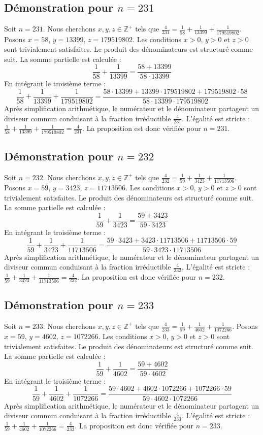 \documentclass[11pt,a4paper]{article}
\begin{document}
\subsection{Démonstration pour $n = 231$}
Soit $n = 231$. Nous cherchons $x, y, z \in \mathbb{Z}^{+}$ tels que $\frac{4}{231} = \frac{1}{58} + \frac{1}{13399} + \frac{1}{179519802}$.
Posons $x = 58$, $y = 13399$, $z = 179519802$.
Les conditions $x > 0$, $y > 0$ et $z > 0$ sont trivialement satisfaites.
Le produit des dénominateurs est structuré comme suit. La somme partielle est calculée :
$$ \frac{1}{58} + \frac{1}{13399} = \frac{58+13399}{58 \cdot 13399} $$
En intégrant le troisième terme :
$$ \frac{1}{58} + \frac{1}{13399} + \frac{1}{179519802} = \frac{58 \cdot 13399 + 13399 \cdot 179519802 + 179519802 \cdot 58}{58 \cdot 13399 \cdot 179519802} $$
Après simplification arithmétique, le numérateur et le dénominateur partagent un diviseur commun conduisant à la fraction irréductible $\frac{4}{231}$.
L'égalité est stricte : $\frac{1}{58} + \frac{1}{13399} + \frac{1}{179519802} = \frac{4}{231}$.
La proposition est donc vérifiée pour $n = 231$.
\subsection{Démonstration pour $n = 232$}
Soit $n = 232$. Nous cherchons $x, y, z \in \mathbb{Z}^{+}$ tels que $\frac{4}{232} = \frac{1}{59} + \frac{1}{3423} + \frac{1}{11713506}$.
Posons $x = 59$, $y = 3423$, $z = 11713506$.
Les conditions $x > 0$, $y > 0$ et $z > 0$ sont trivialement satisfaites.
Le produit des dénominateurs est structuré comme suit. La somme partielle est calculée :
$$ \frac{1}{59} + \frac{1}{3423} = \frac{59+3423}{59 \cdot 3423} $$
En intégrant le troisième terme :
$$ \frac{1}{59} + \frac{1}{3423} + \frac{1}{11713506} = \frac{59 \cdot 3423 + 3423 \cdot 11713506 + 11713506 \cdot 59}{59 \cdot 3423 \cdot 11713506} $$
Après simplification arithmétique, le numérateur et le dénominateur partagent un diviseur commun conduisant à la fraction irréductible $\frac{4}{232}$.
L'égalité est stricte : $\frac{1}{59} + \frac{1}{3423} + \frac{1}{11713506} = \frac{4}{232}$.
La proposition est donc vérifiée pour $n = 232$.
\subsection{Démonstration pour $n = 233$}
Soit $n = 233$. Nous cherchons $x, y, z \in \mathbb{Z}^{+}$ tels que $\frac{4}{233} = \frac{1}{59} + \frac{1}{4602} + \frac{1}{1072266}$.
Posons $x = 59$, $y = 4602$, $z = 1072266$.
Les conditions $x > 0$, $y > 0$ et $z > 0$ sont trivialement satisfaites.
Le produit des dénominateurs est structuré comme suit. La somme partielle est calculée :
$$ \frac{1}{59} + \frac{1}{4602} = \frac{59+4602}{59 \cdot 4602} $$
En intégrant le troisième terme :
$$ \frac{1}{59} + \frac{1}{4602} + \frac{1}{1072266} = \frac{59 \cdot 4602 + 4602 \cdot 1072266 + 1072266 \cdot 59}{59 \cdot 4602 \cdot 1072266} $$
Après simplification arithmétique, le numérateur et le dénominateur partagent un diviseur commun conduisant à la fraction irréductible $\frac{4}{233}$.
L'égalité est stricte : $\frac{1}{59} + \frac{1}{4602} + \frac{1}{1072266} = \frac{4}{233}$.
La proposition est donc vérifiée pour $n = 233$.
\end{document}
